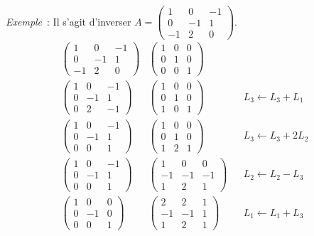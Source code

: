 \emph{Exemple}~: Il s'agit d'inverser $A =\begin{pmatrix}  1 & 0 & -1 \\ 0 & -1 & 1\\ -1 & 2 & 0\end{pmatrix}$.
\begin{align}
  \begin{pmatrix}  1 & 0 & -1 \\ 0 & -1 & 1\\ -1 & 2 & 0\end{pmatrix} & \begin{pmatrix}  1 & 0 & 0 \\ 0 & 1 & 0\\ 0 & 0 & 1\end{pmatrix} \\
  \begin{pmatrix}  1 & 0 & -1 \\ 0 & -1 & 1\\ 0 & 2 & -1\end{pmatrix} & \begin{pmatrix}  1 & 0 & 0 \\ 0 & 1 & 0\\ 1 & 0 & 1\end{pmatrix} && L_3 \leftarrow L_3+L_1\\
  \begin{pmatrix}  1 & 0 & -1 \\ 0 & -1 & 1\\ 0 & 0 & 1\end{pmatrix} & \begin{pmatrix}  1 & 0 & 0 \\ 0 & 1 & 0\\ 1 & 2 & 1\end{pmatrix} && L_3 \leftarrow L_3+2L_2 \\
  \begin{pmatrix}  1 & 0 & -1 \\ 0 & -1 & 1\\ 0 & 0 & 1\end{pmatrix} & \begin{pmatrix}  1 & 0 & 0 \\ -1 & -1 & -1\\ 1 & 2 & 1\end{pmatrix} && L_2 \leftarrow L_2-L_3\\
  \begin{pmatrix}  1 & 0 & 0 \\ 0 & -1 & 0\\ 0 & 0 & 1\end{pmatrix} & \begin{pmatrix}2 & 2 & 1 \\ -1 & -1 & 1\\ 1 & 2 & 1 \end{pmatrix} && L_1 \leftarrow L_1+L_3\\

\end{align}
